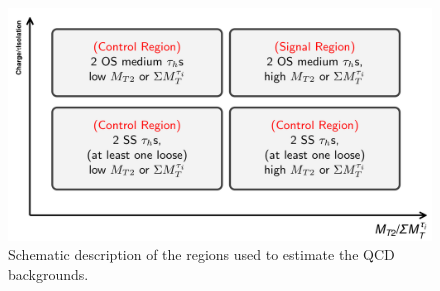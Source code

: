 


\begin{figure}[!Hhtb]
\centering
\includegraphics[angle=0,scale=0.30]{Bkg/ABCD.png}
\caption{Schematic description of the regions used to estimate the QCD backgrounds.}
\label{fig:ABCDQCD}
\end{figure}

